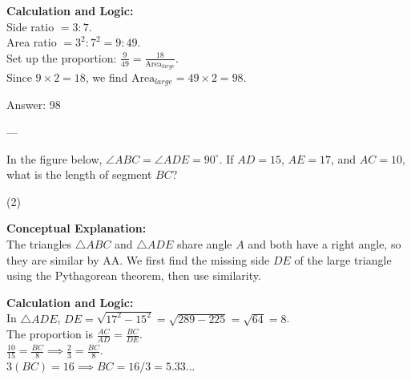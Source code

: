 \documentclass[11pt,paper=a4,answers]{exam}
\begin{document}
\begin{questions}
\begin{solution}
\vspace{10pt}
\textbf{Calculation and Logic:} \\
Side ratio $= 3:7$. \\
Area ratio $= 3^2:7^2 = 9:49$. \\
Set up the proportion: $\frac{9}{49} = \frac{18}{\text{Area}_{large}}$. \\
Since $9 \times 2 = 18$, we find $\text{Area}_{large} = 49 \times 2 = 98$.

\vspace{15pt}
Answer: \colorbox{yellow!100}{98}
\end{solution}

---

\question
In the figure below, $\angle ABC = \angle ADE = 90^\circ$. If $AD = 15$, $AE = 17$, and $AC = 10$, what is the length of segment $BC$?
\begin{center}
\end{center}
\begin{tasks}(2)
\end{tasks}

\begin{solution}
\textbf{Conceptual Explanation:} \\
The triangles $\triangle ABC$ and $\triangle ADE$ share angle $A$ and both have a right angle, so they are similar by AA. We first find the missing side $DE$ of the large triangle using the Pythagorean theorem, then use similarity.

\vspace{10pt}
\textbf{Calculation and Logic:} \\
In $\triangle ADE$, $DE = \sqrt{17^2 - 15^2} = \sqrt{289 - 225} = \sqrt{64} = 8$. \\
The proportion is $\frac{AC}{AD} = \frac{BC}{DE}$. \\
$\frac{10}{15} = \frac{BC}{8} \implies \frac{2}{3} = \frac{BC}{8}$. \\
$3(BC) = 16 \implies BC = 16/3 = 5.33...$


\end{solution}
\end{questions}
\end{document}

